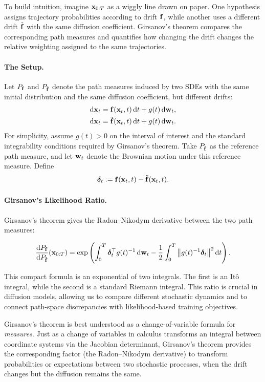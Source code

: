 To build intuition, imagine ${\mathbf{x}}_{0:T}$ as a wiggly line drawn on paper.
One hypothesis assigns trajectory probabilities according to drift ${\mathbf{f}}$,
while another uses a different drift $\tilde{{\mathbf{f}}}$ with the same diffusion
coefficient. Girsanov's theorem compares the corresponding path measures and
quantifies how changing the drift changes the relative weighting assigned to
the same trajectories.

\paragraph{The Setup.}
Let $P_{{\mathbf{f}}}$ and $P_{\tilde{{\mathbf{f}}}}$ denote the path measures induced by
two SDEs with the same initial distribution and the same diffusion
coefficient, but different drifts:
\begin{align*}
    \mathop{}\!\mathrm{d}{\mathbf{x}}_t
    &= {\mathbf{f}}({\mathbf{x}}_t,t)\mathop{}\!\mathrm{d} t + g(t)\mathop{}\!\mathrm{d}{\mathbf{w}}_t,
    \\
    \mathop{}\!\mathrm{d}{\mathbf{x}}_t
    &= \tilde{{\mathbf{f}}}({\mathbf{x}}_t,t)\mathop{}\!\mathrm{d} t + g(t)\mathop{}\!\mathrm{d}{\mathbf{w}}_t.
\end{align*}
For simplicity, assume $g(t)>0$ on the interval of interest and the
standard integrability conditions required by Girsanov's theorem. Take
$P_{\tilde{{\mathbf{f}}}}$ as the reference path measure, and let ${\mathbf{w}}_t$ denote
the Brownian motion under this reference measure. Define
\[
\bm{\delta}_t
:=
{\mathbf{f}}({\mathbf{x}}_t,t)-\tilde{{\mathbf{f}}}({\mathbf{x}}_t,t).
\]

\paragraph{Girsanov's Likelihood Ratio.}
Girsanov's theorem gives the Radon--Nikodym derivative between the two path
measures:
\begin{mdframed}
\[
\frac{\mathop{}\!\mathrm{d} P_{{\mathbf{f}}}}{\mathop{}\!\mathrm{d} P_{\tilde{{\mathbf{f}}}}}({\mathbf{x}}_{0:T})
=
\exp\left(
\int_0^T
\bm{\delta}_t^\top g(t)^{-1}\mathop{}\!\mathrm{d}{\mathbf{w}}_t
-
\frac{1}{2}
\int_0^T
\big\|g(t)^{-1}\bm{\delta}_t\big\|^2
\mathop{}\!\mathrm{d} t
\right).
\]
\end{mdframed}
This compact formula is an exponential of two integrals. The first is an It\^o integral, while the second is a standard Riemann integral. This ratio is crucial in diffusion models, allowing us to compare
different stochastic dynamics and to connect path-space discrepancies
with likelihood-based training objectives.

Girsanov's theorem is best understood as a change-of-variable formula for \emph{measures}. Just as a change of variables in calculus transforms an integral between coordinate systems via the Jacobian determinant, Girsanov's theorem provides the corresponding factor (the Radon–Nikodym derivative) to transform probabilities or expectations between two stochastic processes, when the drift changes but the diffusion remains the same.




